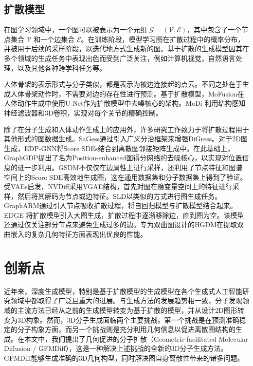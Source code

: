 \subsection{扩散模型}
在图学习领域中，一个图可以被表示为一个元组 $\mathcal{G} = (\mathcal{V}, \mathcal{E})$，其中包含了一个节点集合 $\mathcal{V}$ 和一个边集合 $\mathcal{E}$。在训练阶段，模型学习图在扩散过程中的概率分布，并被用于后续的采样阶段，以迭代地方式生成新的图。基于扩散的生成模型因其在多个领域的生成任务中表现出色而受到广泛关注，例如计算机视觉\cite{blendeddiffusion_avrahami_22,cascadeddiff_ho_22,gradforshapegen_cai_20,sgmpointcloud_luo_21}，自然语言处理\cite{struccddpm_austin_21,argmaxflow_hoogeboom_21,stepunrolled_savinov_22}，以及其他各种跨学科任务等\cite{cdvae_xie_22,housediffusion_shabani_23,nap_lei_23}。

人体骨架的表示形式与分子类似，都是表示为被边连接起的点云。不同之处在于生成人体骨架动作时，不需要对边的存在性进行预测。基于扩散模型，MoFusion\cite{mofusion_dabral_22}在人体动作生成中使用U-Net\cite{unet_ronneberger_15}作为扩散模型中去噪核心的架构。MoDi \cite{modi_raab_22} 利用结构感知神经滤波器和3D卷积，实现对每个关节的精确控制。

除了在分子生成和人体动作生成上的应用外，许多研究工作致力于将扩散过程用于其他形式的图数据生成。SaGess\cite{sagess_limnios_23}通过引入广义分治框架来增强DiGress\cite{digress_vignac_22}。对于2D图生成，EDP-GNN\cite{edpgnn_niu_20}将Score SDEs结合到离散图邻接矩阵生成中。在此基础上，GraphGDP\cite{graphgdp_huang_22}提出了名为Position-enhanced图得分网络的去噪核心，以实现对位置信息的进一步利用。GSDM\cite{gsdm_luo_22}不仅仅在边属性上进行采样，还利用了节点特征和图谱空间上的Score SDE高效地生成图，这在通用数据集和分子数据集上得到了验证。受VAEs启发，NVDiff\cite{nvdiff_chen_22}采用VGAE结构，首先对图在隐变量空间上的特征进行采样，然后将其解码为节点或边特征。SLD\cite{sld_yang_23}以类似的方式进行图生成任务。GraphARM\cite{ardiff_kong_23}通过引入节点吸收扩散过程，将自回归模型与扩散模型结合起来。EDGE \cite{edge_chen_23}将扩散模型引入大图生成，扩散过程中逐渐移除边，直到图为空。该模型还通过仅关注部分节点来避免生成过多的边。专为双曲图设计的HGDM\cite{hgdm_wen_23}在提取双曲嵌入的复杂几何特征方面表现出优良的性能。



\section{创新点}
近年来，深度生成模型，特别是基于扩散模型的生成模型\cite{ddpm_ho_20,sgm_song_19,scoresde_song_21}在各个生成式人工智能研究领域中都取得了广泛且重大的进展。与生成方法的发展趋势相一致，分子发现领域的主流方法已经从之前的生成模型转变为基于扩散的模型，并从设计2D图形转变为3D构象。然而，3D分子生成面临两个主要挑战。第一个挑战是在预测准确稳定的分子构象方面，而另一个挑战则是充分利用几何信息以促进离散图结构的生成。在本文中，我们提出了几何促进的分子扩散（Geometric-facilitated Molecular Diffusion / GFMDiff），这是一种解决上述挑战的全新的3D分子生成方法。GFMDiff能够生成准确的3D几何构型，同时解决图自身离散性带来的诸多问题。

